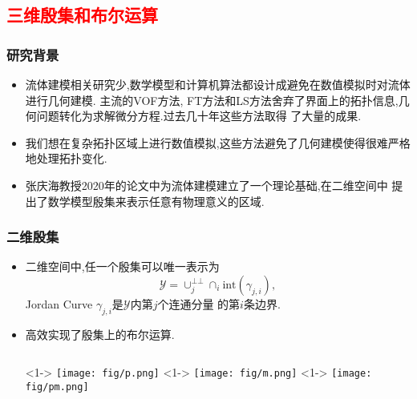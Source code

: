 \documentclass[UTF8]{ctexbeamer}	%
\theoremstyle{plain}
\theoremstyle{definition}
\theoremstyle{remark}
\numberwithin{equation}{section}
\begin{document}
\subsection{\textcolor{red}{三维殷集和布尔运算}}
\begin{frame}
    \frametitle{研究背景}
    \begin{itemize}
        \item 流体建模相关研究少,数学模型和计算机算法都设计成避免在数值模拟时对流体
        进行几何建模.
        主流的VOF方法, FT方法和LS方法舍弃了界面上的拓扑信息,几何问题转化为求解微分方程.过去几十年这些方法取得
        了大量的成果.
        \item 我们想在复杂拓扑区域上进行数值模拟,这些方法避免了几何建模使得很难严格地处理拓扑变化.
        \item 张庆海教授2020年的论文中为流体建模建立了一个理论基础,在二维空间中
        提出了数学模型殷集来表示任意有物理意义的区域.
    \end{itemize}
\end{frame}

\begin{frame}
    \frametitle{二维殷集}
    \begin{itemize}
        \item 二维空间中,任一个殷集可以唯一表示为
        \[\mathcal{Y} = \cup_j^{\bot \bot}\cap_i \text{int}(\gamma_{j, i} ),\]
        Jordan Curve $\gamma_{j, i}$是$\mathcal{Y}$内第$j$个连通分量
        的第$i$条边界.
        \item 高效实现了殷集上的布尔运算. 
        \begin{columns}
            <1->
                \texttt{[image: fig/p.png]}
            <1->
            \texttt{[image: fig/m.png]}
            <1->
            \texttt{[image: fig/pm.png]}
        \end{columns}
    \end{itemize}
\end{frame}
\end{document}
